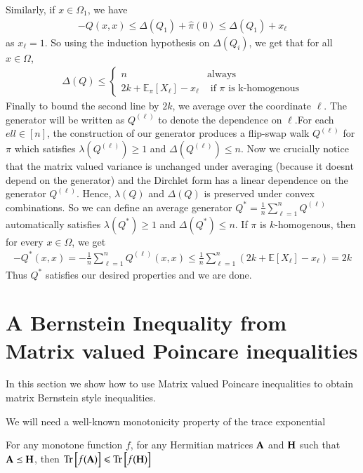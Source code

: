 Similarly, if $x\in\Omega_1$, we have
\begin{align*}
  -Q(x,x) \leq \Delta(Q_1)+\hat{\pi}(0)\leq\Delta(Q_1)+x_\ell
\end{align*}
as $x_\ell=1$. So using the induction hypothesis on $\Delta(Q_i)$, we get that for all $x\in\Omega$,
\begin{align*}\Delta(Q)\leq \begin{cases}
n& \text{always}\\
2k+\mathbb{E}_\pi[X_\ell]-x_\ell&\text{ if } \pi \text{ is k-homogenous}
\end{cases}\end{align*}
Finally to bound the second line by $2k$, we average over the coordinate $\ell$. The generator will be written as $Q^{(\ell)}$ to denote the dependence on $\ell$.For each $ell\in[n]$, the construction of our generator produces a flip-swap walk $Q^{(\ell)}$ for $\pi$ which satisfies $\lambda(Q^{(\ell)})\geq 1$ and $\Delta(Q^{(\ell)})\leq n$. Now we crucially notice that the matrix valued variance is unchanged under averaging (because it doesnt depend on the generator) and the Dirchlet form has a linear dependence on the generator $Q^{(\ell)}$. Hence, $\lambda(Q)$ and $\Delta(Q)$ is preserved under convex combinations. So we can define an average generator $Q^*=\frac{1}{n}\sum\limits_{\ell=1}^{n}Q^{(\ell)}$ automatically satisfies $\lambda(Q^*)\geq 1$ and $\Delta(Q^*)\leq n$. If $\pi$ is $k$-homogenous, then for every $x\in\Omega$, we get
\begin{align*}
  -Q^*(x,x)=-\frac{1}{n}\sum\limits_{\ell=1}^{n}Q^{(\ell)}(x,x) \leq \frac{1}{n}\sum\limits_{\ell=1}^{n}(2k + \mathbb{E}[X_\ell] - x_\ell) = 2k
\end{align*}
Thus $Q^{*}$ satisfies our desired properties and we are done.

\section{A Bernstein Inequality from Matrix valued Poincare inequalities}
In this section we show how to use Matrix valued Poincare inequalities to obtain matrix Bernstein style inequalities.

We will need a well-known monotonicity property of the trace exponential \cite{TroppIntro15}
\begin{lemma}
  \label{lem:trMonotone}
  For any monotone function $f$, for any Hermitian matrices $\bf{A}$ and $\bf{H}$ such that $\bf{A} \preceq \bf{H}$, then $\operatorname{Tr}\big[f(\mathbf{A})\big] \leqslant \operatorname{Tr}\big[ f(\mathbf{H})\big]$
\end{lemma}

